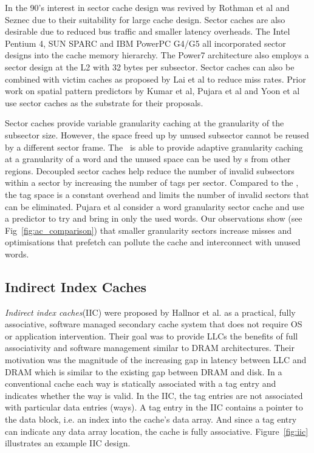 In the 90's interest in sector cache design was revived by Rothman et al\cite{Rothman_Smith_2000} and Seznec\cite{Seznec-decoupled-sector-cache-isca, seznec:inria-00074588} due to their suitability for large cache design. Sector caches are also desirable due to reduced bus traffic and smaller latency overheads.  The Intel Pentium 4, SUN SPARC and IBM PowerPC G4/G5 all incorporated sector designs into the cache memory hierarchy. The Power7 architecture also employs a sector design at the L2 with 32 bytes per subsector. Sector caches can also be combined with victim caches as proposed by Lai et al\cite{Lai-victim-sector} to reduce miss rates. Prior work on spatial pattern predictors by Kumar et al\cite{kumar-isca-1998}, Pujara et al\cite{pujara-hpca-2006} and Yoon et al\cite{Yoon_Jeong_Erez_2011, yoon2012dgms} use sector caches as the substrate for their proposals.

Sector caches provide variable granularity caching at the granularity of the subsector size. However, the space freed up by unused subsector cannot be reused by a different sector frame. The \AC\ is able to provide adaptive granularity caching at a granularity of a word and the unused space can be used by \AB{}s from other regions. Decoupled sector caches\cite{Seznec-decoupled-sector-cache-isca} help reduce the number of invalid subsectors within a sector by increasing the number of tags per sector. Compared to the \AC{}, the tag space is a constant overhead and limits the number of invalid sectors that can be eliminated. Pujara et al\cite{pujara-hpca-2006} consider a word granularity sector cache and use a predictor to try and bring in only the used words. Our observations show (see Fig~\ref{fig:ac_comparison}) that smaller granularity sectors increase misses and optimisations that prefetch can pollute the cache and interconnect with unused words.

\subsection{Indirect Index Caches}
\label{sec:indirect_index_caches}
\textit{Indirect index caches}(IIC) were proposed by Hallnor et al.\cite{Hallnor_Reinhardt_2000} as a practical, fully associative, software managed secondary cache system that does not require OS or application intervention. Their goal was to provide LLCs the benefits of full associativity and software management similar to DRAM architectures. Their motivation was the magnitude of the increasing gap in latency between LLC and DRAM which is similar to the existing gap between DRAM and disk. In a conventional cache each way is statically associated with a tag entry and indicates whether the way is valid. In the IIC, the tag entries are not associated with particular data entries (ways). A tag entry in the IIC contains a pointer to the data block, i.e. an index into the cache's data array. And since a tag entry can indicate any data array location, the cache is fully associative. Figure~\ref{fig:iic} illustrates an example IIC design. 

